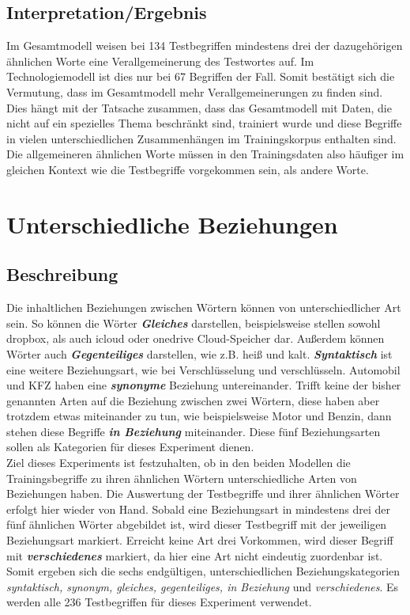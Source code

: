 \documentclass[12pt,a4paper]{report}
\begin{document}
  
		\subsection*{Interpretation/Ergebnis}
		Im Gesamtmodell weisen bei 134 Testbegriffen mindestens drei der dazugehörigen ähnlichen Worte eine Verallgemeinerung des Testwortes auf. Im Technologiemodell ist dies nur bei 67 Begriffen der Fall. Somit bestätigt sich die Vermutung, dass im Gesamtmodell mehr Verallgemeinerungen zu finden sind. Dies hängt mit der Tatsache zusammen, dass das Gesamtmodell mit Daten, die nicht auf ein spezielles Thema beschränkt sind, trainiert wurde und diese Begriffe in vielen unterschiedlichen Zusammenhängen im Trainingskorpus enthalten sind. Die allgemeineren ähnlichen Worte müssen in den Trainingsdaten also häufiger im gleichen Kontext wie die Testbegriffe vorgekommen sein, als andere Worte.\\
		
		
		
		
	
	\section{Unterschiedliche Beziehungen}
		\subsection*{Beschreibung}
		Die inhaltlichen Beziehungen zwischen Wörtern können von unterschiedlicher Art sein. So können die Wörter \textit{\textbf{Gleiches}} darstellen, beispielsweise stellen sowohl \glqq dropbox\grqq, als auch \glqq icloud\grqq{}  oder \glqq onedrive\grqq{} Cloud-Speicher dar. Außerdem können Wörter auch \textit{\textbf{Gegenteiliges}} darstellen, wie z.B. \glqq heiß\grqq{} und \glqq kalt\grqq. \textit{\textbf{Syntaktisch}} ist eine weitere Beziehungsart, wie bei \glqq Verschlüsselung\grqq{} und \glqq verschlüsseln\grqq. \glqq Automobil\grqq{} und \glqq KFZ\grqq{} haben eine \textit{\textbf{synonyme}} Beziehung untereinander. Trifft keine der bisher genannten Arten auf die Beziehung zwischen zwei Wörtern, diese haben aber trotzdem etwas miteinander zu tun, wie beispielsweise \glqq Motor\grqq{} und \glqq Benzin\grqq{}, dann stehen diese Begriffe \textit{\textbf{in Beziehung}} miteinander. Diese fünf Beziehungsarten sollen als Kategorien für dieses Experiment dienen.\\
		 Ziel dieses Experiments ist festzuhalten, ob in den beiden Modellen die Trainingsbegriffe zu ihren ähnlichen Wörtern unterschiedliche Arten von Beziehungen haben. Die Auswertung der Testbegriffe und ihrer ähnlichen Wörter erfolgt hier wieder von Hand. Sobald eine Beziehungsart in mindestens drei der fünf ähnlichen Wörter abgebildet ist, wird dieser Testbegriff mit der jeweiligen Beziehungsart markiert. Erreicht keine Art drei Vorkommen, wird dieser Begriff mit \textit{\textbf{verschiedenes}} markiert, da hier eine Art nicht eindeutig zuordenbar ist. Somit ergeben sich die sechs endgültigen, unterschiedlichen Beziehungskategorien \textit{syntaktisch, synonym, gleiches, gegenteiliges, in Beziehung} und \textit{verschiedenes}. Es werden alle 236 Testbegriffen für dieses Experiment verwendet.\\
		
\end{document}
